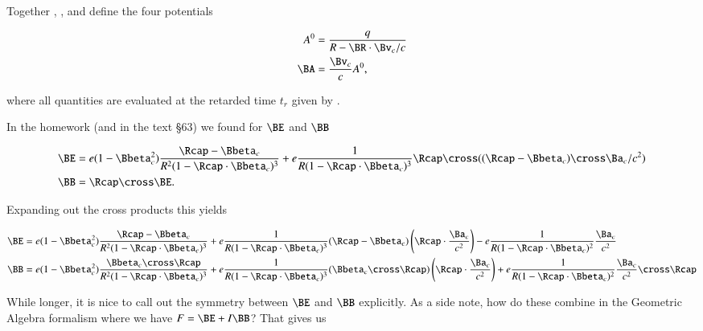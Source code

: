 {Together , , and  define the four potentials

\begin{equation}\label{eqn:relativisticElectrodynamicsExamReflection:910}
\begin{aligned}
A^0 &= \frac{q}{R - \BR \cdot \Bv_c/c} \\
\BA &= \frac{\Bv_c}{c} A^0,
\end{aligned}
\end{equation}

where all quantities are evaluated at the retarded time \(t_r\) given by .

In the homework (and in the text \citep{landau1980classical} \S 63) we found for \(\BE\) and \(\BB\)

\begin{equation}\label{eqn:relativisticElectrodynamicsExamReflection:920}
\begin{aligned}
\BE &= e (1 - \Bbeta_c^2) \frac{\Rcap - \Bbeta_c}{R^2 (1 - \Rcap \cdot \Bbeta_c)^3}
+ e \frac{1}{R (1 - \Rcap \cdot \Bbeta_c)^3} \Rcap \cross ((\Rcap - \Bbeta_c) \cross \Ba_c/c^2) \\
\BB &= \Rcap \cross \BE.
\end{aligned}
\end{equation}

Expanding out the cross products this yields

\begin{equation}\label{eqn:relativisticElectrodynamicsExamReflection:930}
\begin{aligned}
\BE
&= e (1 - \Bbeta_c^2) \frac{\Rcap - \Bbeta_c}{R^2 (1 - \Rcap \cdot \Bbeta_c)^3}
+ e \frac{1}{R (1 - \Rcap \cdot \Bbeta_c)^3} (\Rcap - \Bbeta_c) \left(\Rcap \cdot \frac{\Ba_c}{c^2}\right)
- e \frac{1}{R (1 - \Rcap \cdot \Bbeta_c)^2} \frac{\Ba_c}{c^2} \\
\BB
&= e (1 - \Bbeta_c^2) \frac{\Bbeta_c \cross \Rcap}{R^2 (1 - \Rcap \cdot \Bbeta_c)^3}
+ e \frac{1}{R (1 - \Rcap \cdot \Bbeta_c)^3} (\Bbeta_c \cross \Rcap) \left(\Rcap \cdot \frac{\Ba_c}{c^2} \right)
+ e \frac{1}{R (1 - \Rcap \cdot \Bbeta_c)^2} \frac{\Ba_c}{c^2} \cross \Rcap
\end{aligned}
\end{equation}

While longer, it is nice to call out the symmetry between \(\BE\) and \(\BB\) explicitly.  As a side note, how do these combine in the Geometric Algebra formalism where we have \(F = \BE + I\BB\)?  That gives us

}
